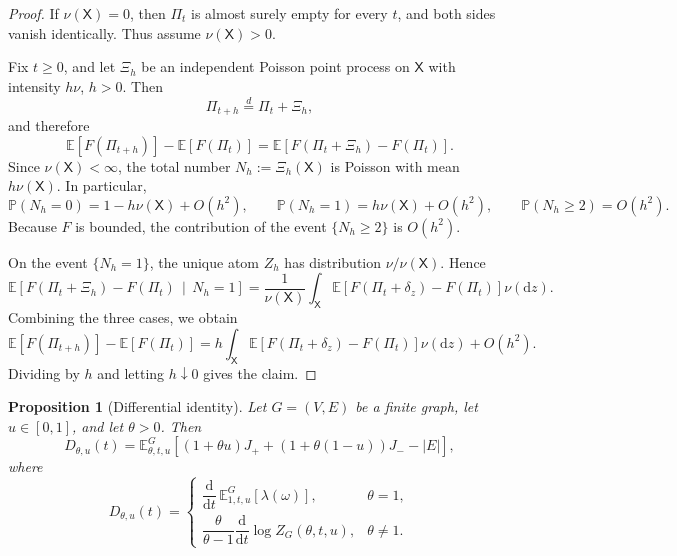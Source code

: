 \documentclass[11pt]{article}
\newtheorem{proposition}[theorem]{Proposition}
\theoremstyle{remark}
\theoremstyle{plain}
\newcommand{\Pbb}{\mathbb{P}}
\newcommand{\Ebb}{\mathbb{E}}
\newcommand{\1}{\mathbbm{1}}
\newcommand{\dd}{\mathrm{d}}
\begin{document}
\begin{proof}
If \(\nu(\mathsf X)=0\), then \(\Pi_t\) is almost surely empty for every \(t\), and
both sides vanish identically. Thus assume \(\nu(\mathsf X)>0\).

Fix \(t\ge 0\), and let \(\Xi_h\) be an independent Poisson point process on
\(\mathsf X\) with intensity \(h\nu\), \(h>0\). Then
\[
\Pi_{t+h}\overset{d}{=}\Pi_t+\Xi_h,
\]
and therefore
\[
\Ebb[F(\Pi_{t+h})]-\Ebb[F(\Pi_t)]
=
\Ebb\!\left[F(\Pi_t+\Xi_h)-F(\Pi_t)\right].
\]
Since \(\nu(\mathsf X)<\infty\), the total number \(N_h:=\Xi_h(\mathsf X)\) is
Poisson with mean \(h\nu(\mathsf X)\). In particular,
\[
\Pbb(N_h=0)=1-h\nu(\mathsf X)+O(h^2),
\qquad
\Pbb(N_h=1)=h\nu(\mathsf X)+O(h^2),
\qquad
\Pbb(N_h\ge 2)=O(h^2).
\]
Because \(F\) is bounded, the contribution of the event \(\{N_h\ge 2\}\) is
\(O(h^2)\).

On the event \(\{N_h=1\}\), the unique atom \(Z_h\) has distribution
\(\nu/\nu(\mathsf X)\). Hence
\[
\Ebb\!\left[F(\Pi_t+\Xi_h)-F(\Pi_t)\,\middle|\,N_h=1\right]
=
\frac{1}{\nu(\mathsf X)}
\int_{\mathsf X}
\Ebb\!\left[F(\Pi_t+\delta_z)-F(\Pi_t)\right]\nu(\dd z).
\]
Combining the three cases, we obtain
\[
\Ebb[F(\Pi_{t+h})]-\Ebb[F(\Pi_t)]
=
h\int_{\mathsf X}
\Ebb\!\left[F(\Pi_t+\delta_z)-F(\Pi_t)\right]\nu(\dd z)
+O(h^2).
\]
Dividing by \(h\) and letting \(h\downarrow 0\) gives the claim.
\end{proof}

\begin{proposition}[Differential identity]
\label{prop:exact-drift}
Let \(G=(V,E)\) be a finite graph, let \(u\in[0,1]\), and let \(\theta>0\). Then
\[
D_{\theta,u}(t)
=
\Ebb_{\theta,t,u}^G\!\left[
(1+\theta u)J_+ + (1+\theta(1-u))J_- - |E|
\right],
\]
where
\[
D_{\theta,u}(t)=
\begin{cases}
\dfrac{\dd}{\dd t}\,\Ebb_{1,t,u}^G[\lambda(\omega)], & \theta=1,\\[1.2ex]
\dfrac{\theta}{\theta-1}\dfrac{\dd}{\dd t}\log Z_G(\theta,t,u), & \theta\neq 1.
\end{cases}
\]
\end{proposition}
\end{document}
